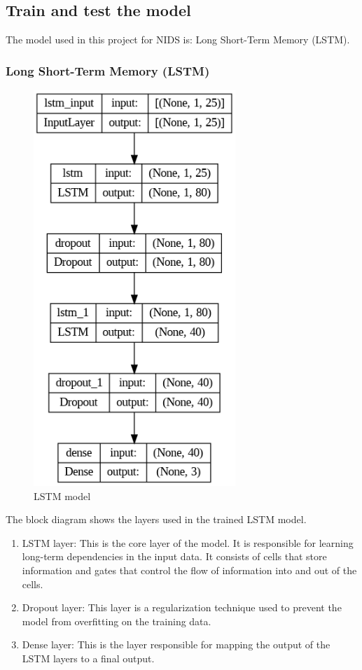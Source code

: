 \subsection{Train and test the model}
\vspace{-18pt}
The model used in this project for NIDS is: Long Short-Term Memory (LSTM).
\par 
\subsubsection{Long Short-Term Memory (LSTM)}
\vspace{-18pt}
\begin{figure}[tbh]
	\begin{center}
		\includegraphics[width=3in]{images/lstm_model.png}
		\caption{LSTM model}
		\label{LSTM model}
	\end{center}
\end{figure}
\newpage
The block diagram shows the layers used in the trained LSTM model.
\begin{enumerate}[label=\roman*.]
	\item LSTM layer: This is the core layer of the model. It is responsible for learning long-term dependencies in the input data. It consists of cells that store information and gates that control the flow of information into and out of the cells.
	\item Dropout layer: This layer is a regularization technique used to prevent the model from overfitting on the training data.
	\item Dense layer: This is the layer responsible for mapping the output of the LSTM layers to a final output. 
\end{enumerate}
